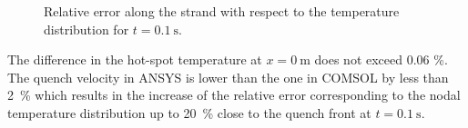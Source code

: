 \begin{figure}[H]
\centering
    \caption{Relative error along the strand with respect to the temperature distribution for $t=0.1~\text{s}$.}
    \label{fig: ans_comsol_comparison_rel_error_temp_f_2_2}
\end{figure}

The difference in the hot-spot temperature at $x=0~\text{m}$ does not exceed 0.06 \%. The quench velocity in ANSYS is lower than the one in COMSOL by less than 2~\% which results in the increase of the relative error corresponding to the nodal temperature distribution up to 20~\% close to the quench front at $t=0.1~\text{s}$.